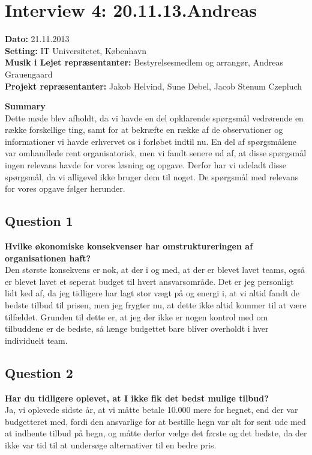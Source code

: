 \section{Interview 4: 20.11.13.Andreas}
\label{sec:interview_4}

\textbf{Dato:} 21.11.2013 \\
\textbf{Setting:} IT Universitetet, København \\
\textbf{Musik i Lejet repræsentanter:} Bestyrelsesmedlem og arrangør, Andreas Grauengaard  \\
\textbf{Projekt repræsentanter:} Jakob Helvind, Sune Debel, Jacob Stenum Czepluch

\bigskip

\noindent \textbf{Summary} \\
Dette møde blev afholdt, da vi havde en del opklarende spørgsmål vedrørende en række forskellige
ting, samt for at bekræfte en række af de observationer og informationer vi havde erhvervet os i
forløbet indtil nu. En del af spørgsmålene var omhandlede \mil rent organisatorisk, men vi fandt
senere ud af, at disse spørgsmål ingen relevans havde for vores løsning og opgave. Derfor har vi
udeladt disse spørgsmål, da vi alligevel ikke bruger dem til noget. De spørgsmål med relevans for
vores opgave følger herunder.

\subsection{Question 1}
\label{i3q1}
\noindent \textbf{Hvilke økonomiske konsekvenser har omstruktureringen af organisationen haft?} 
\\
Den største konsekvens er nok, at der i og med, at der er blevet lavet teams, også er blevet lavet
et seperat budget til hvert ansvarsområde. Det er jeg personligt lidt ked af, da jeg tidligere har
lagt stor vægt på og energi i, at vi altid fandt de bedste tilbud til prisen, men jeg frygter nu, at
dette ikke altid kommer til at være tilfældet. Grunden til dette er, at jeg der ikke er nogen
kontrol med om tilbuddene er de bedste, så længe budgettet bare bliver overholdt i hver individuelt
team.

\subsection{Question 2}
\label{i3q2}
\noindent \textbf{Har du tidligere oplevet, at I ikke fik det bedst mulige tilbud?}
\\
Ja, vi oplevede sidste år, at vi måtte betale 10.000 mere for hegnet, end der var budgetteret med,
fordi den ansvarlige for at bestille hegn var alt for sent ude med at indhente tilbud på hegn, og
måtte derfor vælge det første og det bedste, da der ikke var tid til at undersøge alternativer til
en bedre pris.

